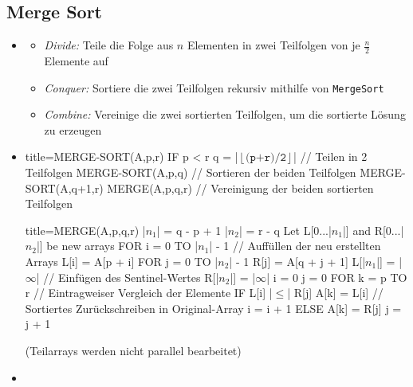 \documentclass[
    12pt,
    a4paper,
    ngerman,
    color=3b,%
    marginpar=false,
    colorback=false,
    leqno,
]{tudaexercise}
\begin{document}
\subsection{Merge Sort} \label{Merge Sort}
\begin{itemize}
    \item {}
          \begin{itemize}
              \item \textit{Divide:} Teile die Folge aus $n$ Elementen in zwei Teilfolgen von je $\frac{n}{2}$ Elemente auf
              \item \textit{Conquer:} Sortiere die zwei Teilfolgen rekursiv mithilfe von \texttt{MergeSort}
              \item \textit{Combine:} Vereinige die zwei sortierten Teilfolgen, um die sortierte Lösung zu erzeugen
          \end{itemize}
    \item {}
          \begin{ccode}[autogobble,escapeinside=||]{title={MERGE-SORT(A,p,r)}}
              IF p < r
                q = |$\left \lfloor \texttt{(p+r)/2} \right \rfloor$| // Teilen in 2 Teilfolgen
                MERGE-SORT(A,p,q) // Sortieren der beiden Teilfolgen
                MERGE-SORT(A,q+1,r)
                MERGE(A,p,q,r) // Vereinigung der beiden sortierten Teilfolgen
          \end{ccode}
          \begin{ccode}[autogobble,escapeinside=||]{title={MERGE(A,p,q,r)}}
              |$n_1$| = q - p + 1
              |$n_2$| = r - q
              Let L[0...|$n_1$|] and R[0...|$n_2$|] be new arrays
              FOR i = 0 TO |$n_1$| - 1 // Auffüllen der neu erstellten Arrays
                L[i] = A[p + i]
              FOR j = 0 TO |$n_2$| - 1
                R[j] = A[q + j + 1]
              L[|$n_1$|] = |$\infty$| // Einfügen des Sentinel-Wertes
              R[|$n_2$|] = |$\infty$|
              i = 0
              j = 0
              FOR k = p TO r  // Eintragweiser Vergleich der Elemente
                IF L[i] |$\leq$| R[j]
                    A[k] = L[i] // Sortiertes Zurückschreiben in Original-Array
                    i = i + 1
                ELSE
                    A[k] = R[j]
                    j = j + 1
          \end{ccode}
          (Teilarrays werden nicht parallel bearbeitet)
    \item {}
          \begin{itemize}

\end{itemize}
\end{itemize}
\end{document}
